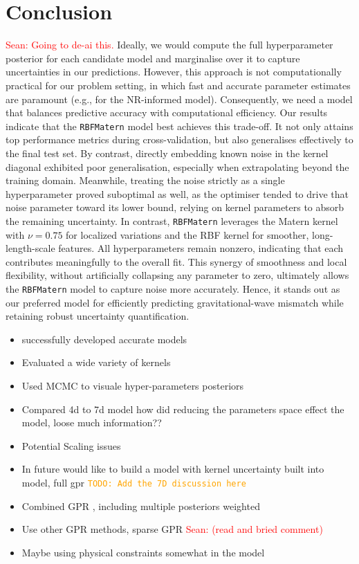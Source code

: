 \documentclass{ucdgradtaughtthesis}
\newcommand{\Sean}[1]{{\textcolor{red}{{Sean: #1}} }}
\newcommand{\todo}[1]{\textcolor{orange}{\texttt{TODO: #1}}}
\begin{document}
\chapter{Conclusion}
\Sean{Going to de-ai this.}
Ideally, we would compute the full hyperparameter posterior for each candidate model and marginalise over it to capture uncertainties in our predictions. However, this approach is not computationally practical for our problem setting, in which fast and accurate parameter estimates are paramount (e.g., for the NR-informed model). Consequently, we need a model that balances predictive accuracy with computational efficiency.
%
Our results indicate that the \texttt{RBFMatern} model best achieves this trade-off. It not only attains top performance metrics during cross-validation, but also generalises effectively to the final test set. By contrast, directly embedding known noise in the kernel diagonal exhibited poor generalisation, especially when extrapolating beyond the training domain. Meanwhile, treating the noise strictly as a single hyperparameter proved suboptimal as well, as the optimiser tended to drive that noise parameter toward its lower bound, relying on kernel parameters to absorb the remaining uncertainty.
%
In contrast, \texttt{RBFMatern} leverages the Matern kernel with \(\nu = 0.75\) for localized variations and the RBF kernel for smoother, long-length-scale features. All hyperparameters remain nonzero, indicating that each contributes meaningfully to the overall fit. This synergy of smoothness and local flexibility, without artificially collapsing any parameter to zero, ultimately allows the \texttt{RBFMatern} model to capture noise more accurately. Hence, it stands out as our preferred model for efficiently predicting gravitational-wave mismatch while retaining robust uncertainty quantification.


\begin{itemize}
    \item successfully developed accurate models
    \item Evaluated a wide variety of kernels
    \item Used MCMC to visuale hyper-parameters posteriors
    \item Compared 4d to 7d model how did reducing the parameters space effect the model, loose much information??
    \item Potential Scaling issues
    \item In future would like to build a model with kernel uncertainty built into model, full gpr
    \todo{Add the 7D discussion here}
    \item Combined GPR , including multiple posteriors weighted
    \item Use other GPR methods, sparse GPR \Sean{(read and bried comment)}
    \item Maybe using physical constraints somewhat in the model
\end{itemize}
\end{document}
